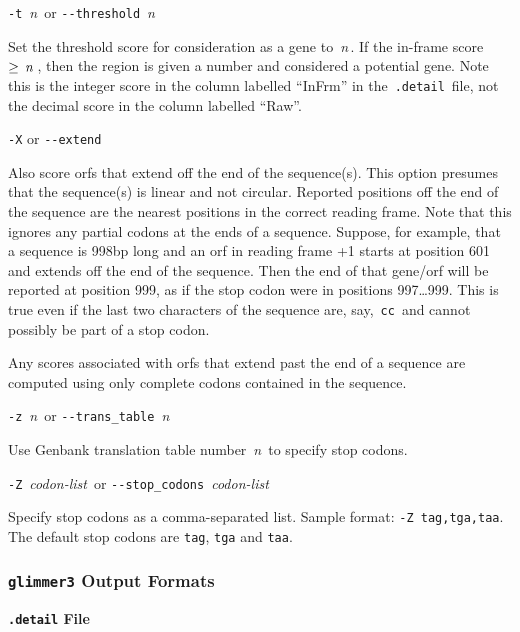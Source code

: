 \documentclass[fleqn,titlepage,11pt]{article}
\def\Desc#1{\,\mbox{\emph{#1}}\,}
\def\Pg#1{\texttt{#1}}
\begin{document}
\exdent
  \verb`-t` \Desc{n} \enskip or \enskip \verb`--threshold` \Desc{n}

  Set the threshold score for consideration as a gene to \Desc{n}.
  If the in-frame
  score $\ge \Desc{n}$, then the region is given a number and considered
  a potential gene.  Note this is the integer score in the column labelled
  ``InFrm'' in the \,\verb`.detail`\, file, not the decimal score in
  the column labelled ``Raw''.

\exdent
  \verb`-X` \enskip or \enskip \verb`--extend`

  Also score orfs that extend off the end of the sequence(s).  This
  option presumes that the sequence(s) is linear and not circular.
  Reported positions off the end of the sequence are the nearest
  positions in the correct reading frame.  Note that this ignores
  any partial codons at the ends of a sequence.  Suppose, for example,
  that a sequence is 998bp long and an orf in reading frame +1
  starts at position 601 and extends off the end of the sequence.
  Then the end of that gene/orf will be reported at position 999,
  as if the stop codon were in positions 997\ldots999.  This is true
  even if the last two characters of the sequence are, say, \,\verb`cc`\,
  and cannot possibly be part of a stop codon.

  Any scores associated with orfs that extend past the end of a
  sequence are computed using only complete codons contained in
  the sequence.
  
\exdent
  \verb`-z` \Desc{n} \enskip or \enskip \verb`--trans_table` \Desc{n}

  Use Genbank translation table number \Desc{n} to specify stop codons.

\exdent
  \verb`-Z` \Desc{codon-list} \enskip or \enskip \verb`--stop_codons` \Desc{codon-list}

  Specify stop codons as a comma-separated list.
  Sample format:  \verb`-Z tag,tga,taa`.
  The default stop codons are \Pg{tag}, \Pg{tga} and \Pg{taa}.
\el


\subsubsection{\Pg{glimmer3} Output Formats}

\smallskip
\noindent\textbf{\Pg{.detail} File}
\smallskip
\end{document}
